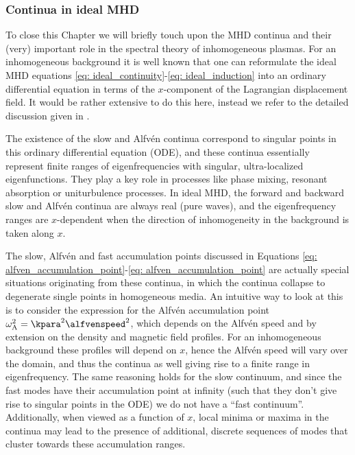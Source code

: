 \subsubsection{Continua in ideal MHD}
To close this Chapter we will briefly touch upon the MHD continua and their (very) important role in the spectral theory of inhomogeneous plasmas. For an inhomogeneous background it is well known that one can reformulate the ideal MHD equations \eqref{eq: ideal_continuity}-\eqref{eq: ideal_induction} into an ordinary differential equation in terms of the $x$-component of the Lagrangian displacement field. It would be rather extensive to do this here, instead we refer to the detailed discussion given in \citet{book_MHD}.

The existence of the slow and Alfv\'en continua correspond to singular points in this ordinary differential equation (\gls{ODE}), and these continua essentially represent finite ranges of eigenfrequencies with singular, ultra-localized eigenfunctions. They play a key role in processes like phase mixing, resonant absorption or uniturbulence processes. In ideal MHD, the forward and backward slow and Alfv\'en continua are always real (pure waves), and the eigenfrequency ranges are $x$-dependent when the direction of inhomogeneity in the background is taken along $x$.

The slow, Alfv\'en and fast accumulation points discussed in Equations \eqref{eq: alfven_accumulation_point}-\eqref{eq: alfven_accumulation_point} are actually special situations originating from these continua, in which the continua collapse to degenerate single points in homogeneous media. An intuitive way to look at this is to consider the expression for the Alfv\'en accumulation point $\omega_\text{A}^2 = \kpara^2\alfvenspeed^2$, which depends on the Alfv\'en speed and by extension on the density and magnetic field profiles. For an inhomogeneous background these profiles will depend on $x$, hence the Alfv\'en speed will vary over the domain, and thus the continua as well giving rise to a finite range in eigenfrequency. The same reasoning holds for the slow continuum, and since the fast modes have their accumulation point at infinity (such that they don't give rise to singular points in the ODE) we do not have a ``fast continuum''. Additionally, when viewed as a function of $x$, local minima or maxima in the continua may lead to the presence of additional, discrete sequences of modes that cluster towards these accumulation ranges.

